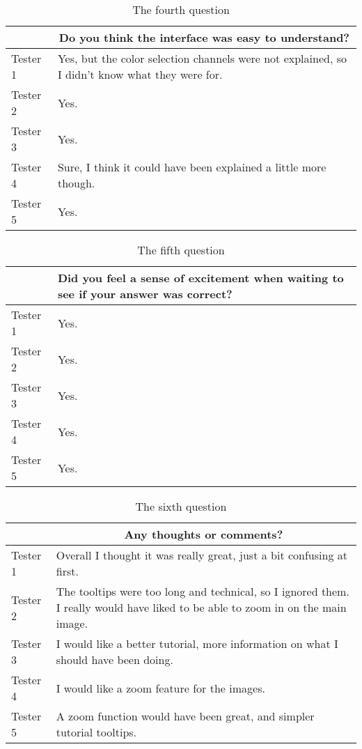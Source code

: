 \begin{table}[H]
\centering
\caption{The fourth question}
\label{tab:question4}
\begin{tabular}{p{1.3cm}p{10cm}}
\toprule
 & \multicolumn{1}{c}{Do you think the interface was easy to understand?} \\ \midrule
Tester 1 & Yes, but the color selection channels were not explained, so I didn't know what they were for. \\
Tester 2 & Yes. \\
Tester 3 & Yes. \\
Tester 4 & Sure, I think it could have been explained a little more though. \\
Tester 5 & Yes. \\ \bottomrule
\end{tabular}
\end{table}

\begin{table}[H]
\centering
\caption{The fifth question}
\label{tab:question5}
\begin{tabular}{p{1.3cm}p{10cm}}
\toprule
 & Did you feel a sense of excitement when waiting to see if your answer was correct? \\ \midrule
Tester 1 & Yes. \\
Tester 2 & Yes. \\
Tester 3 & Yes. \\
Tester 4 & Yes. \\
Tester 5 & Yes. \\ \bottomrule
\end{tabular}
\end{table}

\begin{table}[H]
\centering
\caption{The sixth question}
\label{tab:question5}
\begin{tabular}{p{1.3cm}p{10cm}}
\toprule
 & \multicolumn{1}{c}{Any thoughts or comments?} \\ \midrule
Tester 1 & Overall I thought it was really great, just a bit confusing at first. \\
Tester 2 & The tooltips were too long and technical, so I ignored them. I really would have liked to be able to zoom in on the main image. \\
Tester 3 & I would like a better tutorial, more information on what I should have been doing. \\
Tester 4 & I would like a zoom feature for the images. \\
Tester 5 & A zoom function would have been great, and simpler tutorial tooltips. \\ \bottomrule
\end{tabular}
\end{table}


